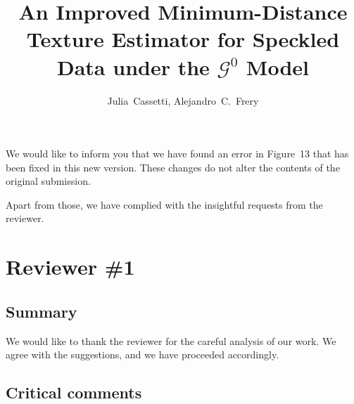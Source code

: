 \documentclass{ar2rc}
\title{An Improved Minimum-Distance Texture Estimator for Speckled Data under the $\mathcal{G}^0$ Model}
\author{Julia~Cassetti,
	Alejandro~C.~Frery}
\begin{document}
	
	\maketitle
	
	We would like to inform you that we have found an error in Figure~13 that has been fixed in this new version.
	These changes do not alter the contents of the original submission.
	
	Apart from those, we have complied with the insightful requests from the reviewer.
	
	\section{Reviewer \#1}
	
	\subsection{Summary}
	
	
	\AR We would like to thank the reviewer for the careful analysis of our work.
	We agree with the suggestions, and we have proceeded accordingly.
	
	\subsection{Critical comments}
	
	
\end{document}
